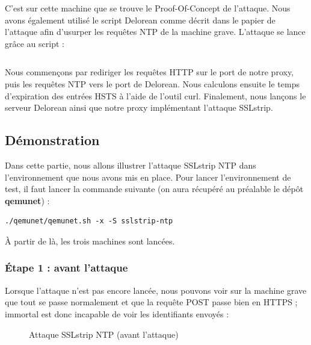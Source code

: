 C'est sur cette machine que se trouve le Proof-Of-Concept de l'attaque. Nous avons également utilisé le script Delorean \cite{delorean} comme décrit dans le papier de l'attaque afin d'usurper les requêtes NTP de la machine grave. L'attaque se lance grâce au script  :

\inputminted[bgcolor=lbcolor, breaklines]{bash}{../sslstrip-ntp/immortal/attack.sh}

Nous commençons par rediriger les requêtes HTTP sur le port de notre proxy, puis les requêtes NTP vers le port de Delorean. Nous calculons ensuite le temps d'expiration des entrées HSTS à l'aide de l'outil curl. Finalement, nous lançons le serveur Delorean ainsi que notre proxy implémentant l'attaque SSLstrip.

\subsection{Démonstration}

Dans cette partie, nous allons illustrer l'attaque SSLstrip NTP dans l'environnement que nous avons mis en place. Pour lancer l'environnement de test, il faut lancer la commande suivante (on aura récupéré au préalable le dépôt \textbf{qemunet}) :

\begin{verbatim}
./qemunet/qemunet.sh -x -S sslstrip-ntp
\end{verbatim}

À partir de là, les trois machines sont lancées.

\subsubsection{Étape 1 : avant l'attaque}

Lorsque l'attaque n'est pas encore lancée, nous pouvons voir sur la machine grave que tout se passe normalement et que la requête POST passe bien en HTTPS ; immortal est donc incapable de voir les identifiants envoyés :

\begin{figure}[H]
  \caption{Attaque SSLstrip NTP (avant l'attaque)}
\end{figure}


